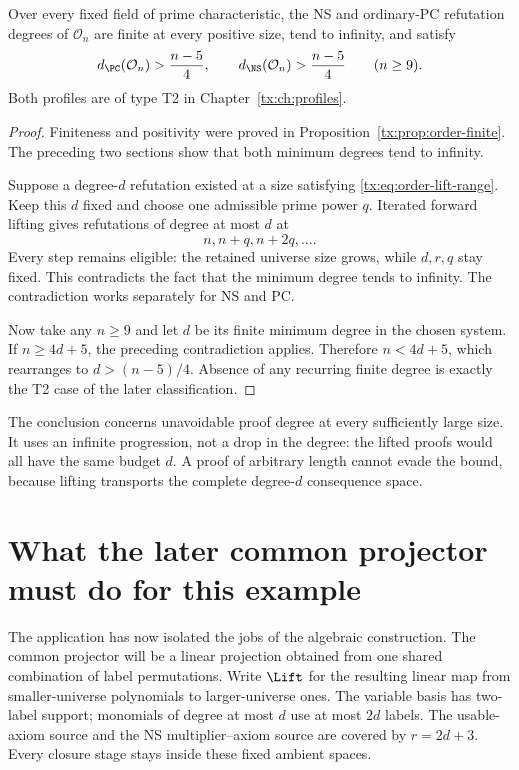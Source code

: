 \begin{theorem}
\label{tx:thm:order-linear}
Over every fixed field of prime characteristic, the NS and ordinary-PC
refutation degrees of $\mathcal O_n$ are finite at every positive
size, tend to infinity, and satisfy
\begin{equation}\label{tx:eq:order-linear-bound}
 d_{\PC}(\mathcal O_n)>\frac{n-5}{4},\qquad
 d_{\NS}(\mathcal O_n)>\frac{n-5}{4}\qquad(n\ge9).
\end{equation}
Both profiles are of type T2 in Chapter~\ref{tx:ch:profiles}.
\end{theorem}
\begin{proof}
Finiteness and positivity were proved in
Proposition~\ref{tx:prop:order-finite}. The preceding two sections show
that both minimum degrees tend to infinity.

Suppose a degree-$d$ refutation existed at a size satisfying
\eqref{tx:eq:order-lift-range}. Keep this $d$ fixed and choose one
admissible prime power $q$. Iterated forward lifting gives refutations
of degree at most $d$ at
\[
                            n,n+q,n+2q,\ldots.
\]
Every step remains eligible: the retained universe size grows, while $d,r,q$
stay fixed. This contradicts the fact that the minimum degree tends
to infinity. The contradiction works separately for NS and PC.

Now take any $n\ge9$ and let $d$ be its finite minimum degree in the
chosen system. If $n\ge4d+5$, the preceding contradiction applies.
Therefore $n<4d+5$, which rearranges to
$d>(n-5)/4$. Absence of any recurring finite degree is exactly the
T2 case of the later classification.
\end{proof}

The conclusion concerns unavoidable proof degree at every sufficiently
large size. It uses an infinite progression, not a drop in the degree:
the lifted proofs would all have the same budget $d$. A proof of
arbitrary length cannot evade the bound, because lifting transports
the complete degree-$d$ consequence space.

\section{What the later common projector must do for this example}
The application has now isolated the jobs of the algebraic construction.
The common projector will be a linear projection obtained from one
shared combination of label permutations. Write $\Lift$ for the
resulting linear map from smaller-universe polynomials to larger-universe ones.
The variable basis has two-label support; monomials of degree at most
$d$ use at most $2d$ labels. The usable-axiom source and the NS
multiplier--axiom source are covered by $r=2d+3$. Every closure stage
stays inside these fixed ambient spaces.

